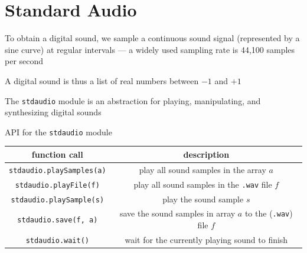 \documentclass[8pt,a4paper,compress]{beamer}
\begin{document}
\section{Standard Audio}
\begin{frame}[fragile]
\pause

To obtain a digital sound, we sample a continuous sound signal (represented by a sine curve) at regular intervals --- a widely used sampling rate is 44,100 samples per second

\pause\bigskip

A digital sound is thus a list of real numbers between $-1$ and $+1$

\pause\bigskip

The \lstinline{stdaudio} module is an abstraction for playing, manipulating, and synthesizing digital sounds

\pause\bigskip

API for the \lstinline{stdaudio} module
\begin{center}
\begin{tabular}{cc}
function call & description \\ \hline
\lstinline$stdaudio.playSamples(a)$ & play all sound samples in the array $a$ \\
\lstinline$stdaudio.playFile(f)$ & play all sound samples in the \lstinline$.wav$ file $f$ \\
\lstinline$stdaudio.playSample(s)$ & play the sound sample $s$ \\
\lstinline$stdaudio.save(f, a)$ & save the sound samples in array $a$ to the (\lstinline$.wav$) file $f$ \\
\lstinline$stdaudio.wait()$ & wait for the currently playing sound to finish
\end{tabular} 
\end{center}
\end{frame}
\end{document}
